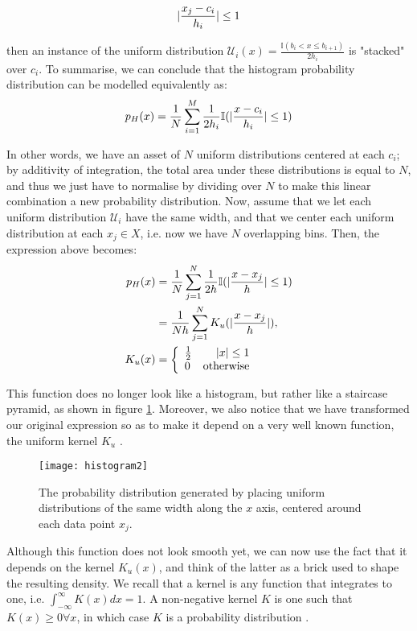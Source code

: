 \documentclass[../main.tex]{subfiles}
\begin{document}
\begin{align*}
\lvert\frac{x_j - c_i}{h_i}\rvert \leq 1
\end{align*}
\par then an instance of the uniform distribution $\mathcal{U}_i(x) = \frac{\mathbb{I}(b_i < x \leq b_{i+1})}{2h_i}$ is "stacked" over $c_i$. To summarise, we can conclude that the histogram probability distribution can be modelled equivalently as:
\begin{align*}
p_H(x) = \frac{1}{N}\sum_{i=1}^M\frac{1}{2h_i}\mathbb{I}(\lvert\frac{x - c_i}{h_i}\rvert \leq 1)
\end{align*}
\par In other words, we have an asset of $N$ uniform distributions centered at each $c_i$; by additivity of integration, the total area under these distributions is equal to $N$, and thus we just have to normalise by dividing over $N$ to make this linear combination a new probability distribution. Now, assume that we let each uniform distribution $\mathcal{U}_i$ have the same width, and that we center each uniform distribution at each $x_j \in X$, i.e. now we have $N$ overlapping bins. Then, the expression above becomes:
\begin{align*}
p_{H}(x) &= \frac{1}{N}\sum_{j=1}^N\frac{1}{2h}\mathbb{I}(\lvert\frac{x - x_j}{h}\rvert \leq 1)\\
&= \frac{1}{Nh}\sum_{j=1}^NK_u(\lvert\frac{x - x_j}{h}\rvert),\\
K_u(x) &= \left\{
     \begin{array}{lr}
      \frac{1}{2} & \lvert x\rvert \leq 1 \\
      0 & \text{otherwise} 
     \end{array}
   \right.
\end{align*}
\par This function does no longer look like a histogram, but rather like a staircase pyramid, as shown in figure \ref{fig_hist2}. Moreover, we also notice that we have transformed our original expression so as to make it depend on a very well known function, the uniform kernel $K_u$ \cite{Hansen2009}. 
\begin{figure}[t]
\centering
\texttt{[image: histogram2]}
\caption{The probability distribution generated by placing uniform distributions of the same width along the $x$ axis, centered around each data point $x_j$.}
\label{fig_hist2}
\end{figure}
\par Although this function does not look smooth yet, we can now use the fact that it depends on the kernel $K_u(x)$, and think of the latter as a brick used to shape the resulting density. We recall that a kernel is any function that integrates to one, i.e. $\int_{-\infty}^\infty K(x)dx = 1$. A non-negative kernel $K$ is one such that $K(x) \geq 0 \forall x$, in which case $K$ is a probability distribution \cite{Hansen2009}.
\end{document}

